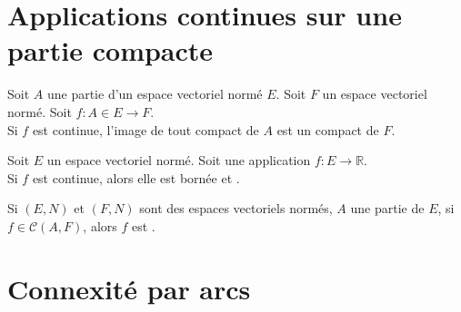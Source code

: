 \documentclass[11pt,a4paper,fleqn,pdftex]{report}
\begin{document}
\section{Applications continues sur une partie compacte} %
\label{sec:applications_continues_sur_une_partie_compacte}
\begin{itheorem}
     Soit $A$ une partie d'un espace vectoriel normé $E$. Soit $F$ un espace vectoriel normé. Soit $f : A \in E \to F$.\\
     Si $f$ est continue, l'image de tout compact de $A$ est un compact de $F$.
\end{itheorem}
\begin{theorem}
     Soit $E$ un espace vectoriel normé. Soit une application $f : E \to \mathbb{R}$. \\
     Si $f$ est continue, alors elle est bornée et .
\end{theorem}
\begin{itheorem}
    Si $(E,N)$ et $(F,N)$ sont des espaces vectoriels normés, $A$ une partie  de $E$, \linebreak si $f\in \mathcal{C}(A,F)$, alors $f$ est .
\end{itheorem}
\section{Connexité par arcs} %
\label{sec:connexe_par_arcs}
\end{document}
